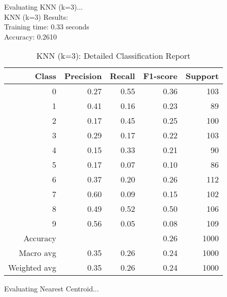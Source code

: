 Evaluating KNN (k=3)...\\

KNN (k=3) Results:\\
Training time: 0.33 seconds\\
Accuracy: 0.2610
\begin{table}[H]
  \centering
  \begin{tabular}{r r r r r}
    \toprule
    Class & Precision & Recall & F1-score & Support \\
    \midrule
    0 & 0.27 & 0.55 & 0.36 & 103 \\
    1 & 0.41 & 0.16 & 0.23 & 89 \\
    2 & 0.17 & 0.45 & 0.25 & 100 \\
    3 & 0.29 & 0.17 & 0.22 & 103 \\
    4 & 0.15 & 0.33 & 0.21 & 90 \\
    5 & 0.17 & 0.07 & 0.10 & 86 \\
    6 & 0.37 & 0.20 & 0.26 & 112 \\
    7 & 0.60 & 0.09 & 0.15 & 102 \\
    8 & 0.49 & 0.52 & 0.50 & 106 \\
    9 & 0.56 & 0.05 & 0.08 & 109 \\
    \midrule
    Accuracy & & & 0.26 & 1000 \\
    Macro avg & 0.35 & 0.26 & 0.24 & 1000 \\
    Weighted avg & 0.35 & 0.26 & 0.24 & 1000 \\
    \bottomrule
  \end{tabular}
  \vspace{10pt}
  \caption{KNN (k=3): Detailed Classification Report}
\end{table}

Evaluating Nearest Centroid...\\

